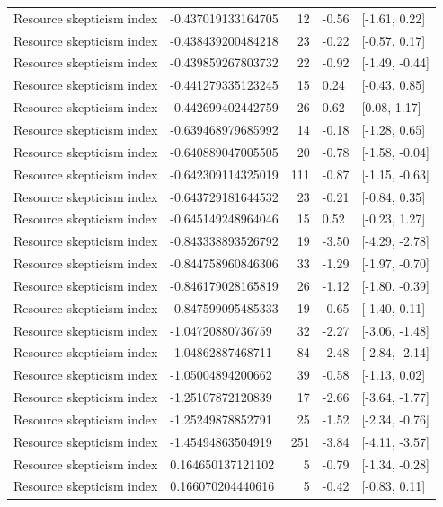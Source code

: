\begin{tabular}{llrll}
Resource skepticism index & -0.437019133164705 & 12 & -0.56 & {}[-1.61, 0.22]\\
Resource skepticism index & -0.438439200484218 & 23 & -0.22 & {}[-0.57, 0.17]\\
Resource skepticism index & -0.439859267803732 & 22 & -0.92 & {}[-1.49, -0.44]\\
Resource skepticism index & -0.441279335123245 & 15 & 0.24 & {}[-0.43, 0.85]\\
\addlinespace
Resource skepticism index & -0.442699402442759 & 26 & 0.62 & {}[0.08, 1.17]\\
Resource skepticism index & -0.639468979685992 & 14 & -0.18 & {}[-1.28, 0.65]\\
Resource skepticism index & -0.640889047005505 & 20 & -0.78 & {}[-1.58, -0.04]\\
Resource skepticism index & -0.642309114325019 & 111 & -0.87 & {}[-1.15, -0.63]\\
Resource skepticism index & -0.643729181644532 & 23 & -0.21 & {}[-0.84, 0.35]\\
\addlinespace
Resource skepticism index & -0.645149248964046 & 15 & 0.52 & {}[-0.23, 1.27]\\
Resource skepticism index & -0.843338893526792 & 19 & -3.50 & {}[-4.29, -2.78]\\
Resource skepticism index & -0.844758960846306 & 33 & -1.29 & {}[-1.97, -0.70]\\
Resource skepticism index & -0.846179028165819 & 26 & -1.12 & {}[-1.80, -0.39]\\
Resource skepticism index & -0.847599095485333 & 19 & -0.65 & {}[-1.40, 0.11]\\
\addlinespace
Resource skepticism index & -1.04720880736759 & 32 & -2.27 & {}[-3.06, -1.48]\\
Resource skepticism index & -1.04862887468711 & 84 & -2.48 & {}[-2.84, -2.14]\\
Resource skepticism index & -1.05004894200662 & 39 & -0.58 & {}[-1.13, 0.02]\\
Resource skepticism index & -1.25107872120839 & 17 & -2.66 & {}[-3.64, -1.77]\\
Resource skepticism index & -1.25249878852791 & 25 & -1.52 & {}[-2.34, -0.76]\\
\addlinespace
Resource skepticism index & -1.45494863504919 & 251 & -3.84 & {}[-4.11, -3.57]\\
Resource skepticism index & 0.164650137121102 & 5 & -0.79 & {}[-1.34, -0.28]\\
Resource skepticism index & 0.166070204440616 & 5 & -0.42 & {}[-0.83, 0.11]\\

\end{tabular}

